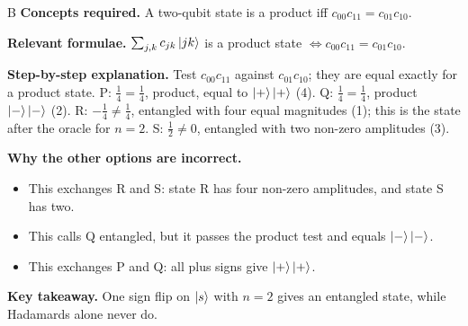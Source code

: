 \documentclass[11pt,a4paper]{article}
\newcommand{\qsep}{\par\vspace{2pt}{\color{black!15}\hrule}\vspace{4pt}}
\begin{document}
\begin{solbox}{B}
\textbf{\color{brand}Concepts required.} A two-qubit state is a product iff $c_{00}c_{11} = c_{01}c_{10}$.

\textbf{\color{brand}Relevant formulae.} $\sum_{j,k}c_{jk}\ket{jk}$ is a product state $\iff c_{00}c_{11} = c_{01}c_{10}$.

\textbf{\color{brand}Step-by-step explanation.} Test $c_{00}c_{11}$ against $c_{01}c_{10}$; they are equal exactly for a product state.
P: $\frac14 = \frac14$, product, equal to $\ket{+}\ket{+}$ (4). Q: $\frac14 = \frac14$, product $\ket{-}\ket{-}$ (2).
R: $-\frac14 \ne \frac14$, entangled with four equal magnitudes (1); this is the state after the oracle for $n = 2$. S: $\frac12 \ne 0$, entangled with two non-zero amplitudes (3).

\textbf{\color{brand}Why the other options are incorrect.}
\begin{itemize}[leftmargin=2.4em, itemsep=1pt, topsep=2pt]
\item[\textbf{(A)}] This exchanges R and S: state R has four non-zero amplitudes, and state S has two.
\item[\textbf{(C)}] This calls Q entangled, but it passes the product test and equals $\ket{-}\ket{-}$.
\item[\textbf{(D)}] This exchanges P and Q: all plus signs give $\ket{+}\ket{+}$.
\end{itemize}
\textbf{\color{brand}Key takeaway.} One sign flip on $\ket{s}$ with $n = 2$ gives an entangled state, while Hadamards alone never do.
\end{solbox}
\qsep
\end{document}

